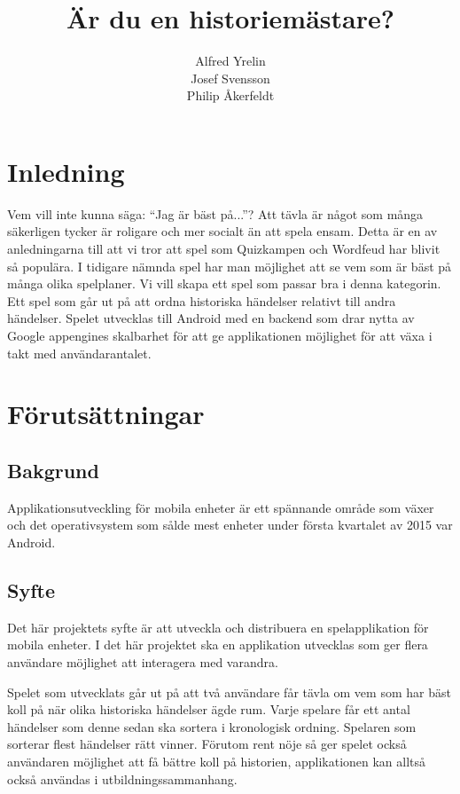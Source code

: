 \documentclass[swedish,12pt,a4paper]{article}
\author{Alfred Yrelin\\Josef Svensson\\Philip Åkerfeldt}
\title{Är du en historiemästare?}
\begin{document}
\maketitle
\newpage
\begin{abstract}


\end{abstract}
\pagebreak
\section{Inledning}
Vem vill inte kunna säga: ``Jag är bäst på...''? Att tävla är något som många säkerligen tycker är roligare och mer socialt än att spela ensam. Detta är en av anledningarna till att vi tror att spel som Quizkampen och Wordfeud har blivit så populära\cite{quiz}. I tidigare nämnda spel har man möjlighet att se vem som är bäst på många olika spelplaner. Vi vill skapa ett spel som passar bra i denna kategorin. Ett spel som går ut på att ordna historiska händelser relativt till andra händelser. Spelet utvecklas till Android med en backend som drar nytta av Google appengines skalbarhet för att ge applikationen möjlighet för att växa i takt med användarantalet. 
\section{Förutsättningar}
\subsection{Bakgrund}
Applikationsutveckling för mobila enheter är ett spännande område som växer\cite{trendforce} och det operativsystem som sålde mest enheter under första kvartalet av 2015 var Android. 

\subsection{Syfte}
Det här projektets syfte är att utveckla och distribuera en spelapplikation för mobila enheter. I det här projektet ska en applikation utvecklas som ger flera användare möjlighet att interagera med varandra.

Spelet som utvecklats går ut på att två användare får tävla om vem som har bäst koll på när olika historiska händelser ägde rum. Varje spelare får ett antal händelser som denne sedan ska sortera i kronologisk ordning. Spelaren som sorterar flest händelser rätt vinner. Förutom rent nöje så ger spelet också användaren möjlighet att få bättre koll på historien, applikationen kan alltså också användas i utbildningssammanhang.
\end{document}
